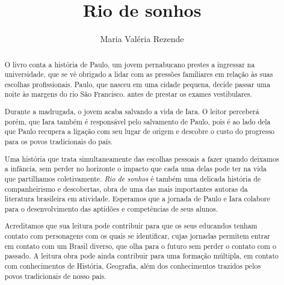 \documentclass[12pt]{extarticle}
\begin{document}

\newcommand{\AutorLivro}{Maria Valéria Rezende}
\newcommand{\TituloLivro}{Rio de sonhos}
\newcommand{\Tema}{Ficção, mistério e fantasia}
\newcommand{\Genero}{Novela}
\newcommand{\imagemCapa}{./images/PNLD0051-01.png}
\newcommand{\issnppub}{---}
\newcommand{\issnepub}{---}
\newcommand{\colaborador}{\textbf{Raphaella Lira} é uma pessoa incrível e vai fazer um bom serviço.}

\title{\TituloLivro}
\author{\AutorLivro}
\def\authornotes{\colaborador}

\date{}
\maketitle

\begin{abstract}

O livro conta a história de Paulo, um jovem pernabucano prestes a ingressar na universidade, 
que se vê obrigado a lidar 
com as pressões familiares em relação às suas escolhas profissionais.
Paulo, que nasceu em uma cidade pequena, decide passar uma noite às margens do rio São Francisco.
antes de prestar os exames vestibulares.

Durante a madrugada, o jovem acaba salvando a vida de Iara. 
O leitor perceberá porém, que Iara também é responsável pelo 
salvamento de Paulo, pois é ao
lado dela que Paulo recupera a ligação com seu lugar de origem
e descobre o custo do progresso para os povos tradicionais do
país.

Uma história que trata simultaneamente das escolhas pessoais 
a fazer quando deixamos a infância, sem perder no horizonte
o impacto que cada uma delas pode ter na vida que partilhamos
coletivamente. \emph{Rio de sonhos} é também uma delicada história de
companheirismo e descobertas, obra de uma das mais importantes autoras
da literatura brasileira em atividade. Esperamos que a jornada de Paulo
e Iara colabore para o desenvolvimento das aptidões e competências de
seus alunos.

Acreditamos que sua leitura pode
contribuir para que os seus educandos tenham contato com personagens com os
quais se identificar, cujas jornadas permitem entrar em
contato com um Brasil diverso, que olha para o futuro sem perder o
contato com o passado. A leitura obra pode ainda 
contribuir para uma formação múltipla, em contato com conhecimentos de
História, Geografia, além dos conhecimentos trazidos pelos povos
tradicionais de nosso país.

\end{abstract}
\end{document}
